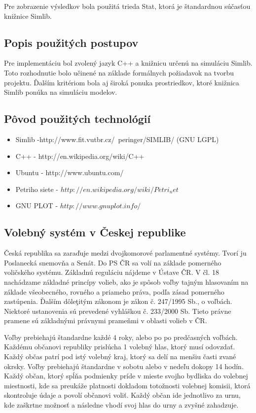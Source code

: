 \documentclass[12pt,a4paper,titlepage,final]{article}
\begin{document}
\indent


Pre zobrazenie výsledkov bola použitá trieda Stat, ktorá je štandardnou súčasťou knižnice Simlib.


\subsection{Popis použitých postupov}
Pre implementáciu bol zvolený jazyk C++ a knižnicu určenú na simuláciu Simlib. Toto rozhodnutie bolo učinené na základe formálnych požiadavok na tvorbu projektu. Ďalším kritériom bola aj široká ponuka prostriedkov, ktoré knižnica Simlib ponúka na simuláciu modelov. 


\subsection{Pôvod použitých technológií}
\begin{itemize}
\item Simlib -http://www.fit.vutbr.cz/~peringer/SIMLIB/ (GNU LGPL)
\item C++ - http://en.wikipedia.org/wiki/C++
\item Ubuntu - http://www.ubuntu.com/
\item Petriho siete - $http://en.wikipedia.org/wiki/Petri_net$
\item GNU PLOT - $http://www.gnuplot.info/$

\end{itemize}
\subsection{Volebný systém v Českej republike}
Česká republika sa zaraďuje medzi dvojkomorové parlamentné 
systémy. Tvorí ju Poslanecká snemovňa a Senát. Do PS ČR sa volí na 
základe pomerného voličského systému. Základnú reguláciu nájdeme 
v Ústave ČR. V čl. 18 nachádzame základné princípy volieb, ako je spôsob 
voľby tajným hlasovaním na základe všeobecného, rovného a priameho 
práva, podľa zásad pomerného zastúpenia. Ďalším dôleţitým zákonom je 
zákon č. 247/1995 Sb., o voľbách. Niektoré ustanovenia sú prevedené 
vyhláškou č. 233/2000 Sb. Tieto právne pramene sú základnými právnymi 
prameňmi v oblasti volieb v ČR.\cite{Seda:Voleb}

Voľby prebiehajú štandardne každé 4 roky, alebo po po predčasných voľbách. Každému občanovi republiky prislúcha 1 volebný hlas, ktorý musí odovzdať. Každý občas patrí pod istý volebný kraj, ktorý sa delí na menšiu časti zvané okrsky. Voľby prebiehajú štandardne v sobotu alebo v nedeľu dokopy 14 hodín. Každý občan, ktorý spĺňa podmienky príde v mieste svojho bydliska do volebnej miestnosti, kde sa preukáže platnosti dokladom totožnosti volebnej komisii, ktorá skontroluje údaje a povolí občanovi voliť. Každý občan ide jednotlivo za urnu, kde zaškrtne možnosť a následne vhodí svoj hlas do urny a zvyšné zahadzuje.
\end{document}
